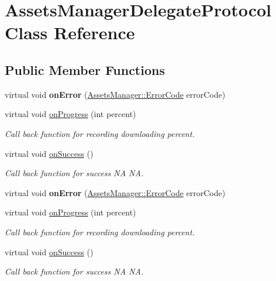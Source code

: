 \hypertarget{classAssetsManagerDelegateProtocol}{}\section{Assets\+Manager\+Delegate\+Protocol Class Reference}
\label{classAssetsManagerDelegateProtocol}
\subsection*{Public Member Functions}
\begin{DoxyCompactItemize}
\item 
\mbox{\label{classAssetsManagerDelegateProtocol_a57082ca184c54bf239401e04f5bf55e5}} 
virtual void {\bfseries on\+Error} (\hyperlink{classAssetsManager_a5e348d12e70204e183b449f8dec2577d}{Assets\+Manager\+::\+Error\+Code} error\+Code)
\item 
virtual void \hyperlink{classAssetsManagerDelegateProtocol_ac72f8ce1d5af0aa8044352658033fb95}{on\+Progress} (int percent)
\begin{DoxyCompactList}\small\item\em Call back function for recording downloading percent. \end{DoxyCompactList}\item 
\mbox{\label{classAssetsManagerDelegateProtocol_a3a6c17217d8bf0437f411748e610acd9}} 
virtual void \hyperlink{classAssetsManagerDelegateProtocol_a3a6c17217d8bf0437f411748e610acd9}{on\+Success} ()
\begin{DoxyCompactList}\small\item\em Call back function for success  NA  NA. \end{DoxyCompactList}\item 
\mbox{\label{classAssetsManagerDelegateProtocol_a57082ca184c54bf239401e04f5bf55e5}} 
virtual void {\bfseries on\+Error} (\hyperlink{classAssetsManager_a5e348d12e70204e183b449f8dec2577d}{Assets\+Manager\+::\+Error\+Code} error\+Code)
\item 
virtual void \hyperlink{classAssetsManagerDelegateProtocol_ac72f8ce1d5af0aa8044352658033fb95}{on\+Progress} (int percent)
\begin{DoxyCompactList}\small\item\em Call back function for recording downloading percent. \end{DoxyCompactList}\item 
\mbox{\label{classAssetsManagerDelegateProtocol_a3a6c17217d8bf0437f411748e610acd9}} 
virtual void \hyperlink{classAssetsManagerDelegateProtocol_a3a6c17217d8bf0437f411748e610acd9}{on\+Success} ()
\begin{DoxyCompactList}\small\item\em Call back function for success  NA  NA. \end{DoxyCompactList}\end{DoxyCompactItemize}


